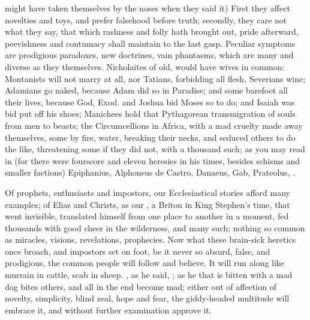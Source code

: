 {might have taken themselves by the noses when they said it) First
they affect novelties and toys, and prefer falsehood before truth;
secondly, they care not what they say, that which rashness and
folly hath brought out, pride afterward, peevishness and contumacy
shall maintain to the last gasp. Peculiar symptoms are prodigious
paradoxes, new doctrines, vain phantasms, which are many and diverse as
they themselves. Nicholaites of old, would have wives in common:
Montanists will not marry at all, nor Tatians, forbidding all flesh,
Severians wine; Adamians go naked, because Adam did so in
Paradise; and some barefoot all their lives, because God, Exod.
 and Joshua  bid Moses so to do; and Isaiah  was bid put off
his shoes; Manichees hold that Pythagorean transmigration of souls from
men to beasts; the Circumcellions in Africa, with a mad cruelty
made away themselves, some by fire, water, breaking their necks, and
seduced others to do the like, threatening some if they did not, with a
thousand such; as you may read in \Austin{} (for there were
fourscore and eleven heresies in his times, besides schisms and smaller
factions) Epiphanius, Alphonsus de Castro, Danaeus, Gab, Prateolus, \etc{}.

Of prophets, enthusiasts and impostors, our Ecclesiastical stories
afford many examples; of Elias and Christs, as our , a Briton in King Stephen's time, that went invisible,
translated himself from one place to another in a moment, fed thousands with
good cheer in the wilderness, and many such; nothing so common as
miracles, visions, revelations, prophecies. Now what these brain-sick
heretics once broach, and impostors set on foot, be it never so absurd,
false, and prodigious, the common people will follow and believe. It
will run along like murrain in cattle, scab in sheep. , as
he said, ; as he that is bitten with a
mad dog bites others, and all in the end become mad; either out of
affection of novelty, simplicity, blind zeal, hope and fear, the
giddy-headed multitude will embrace it, and without further examination
approve it.

}
